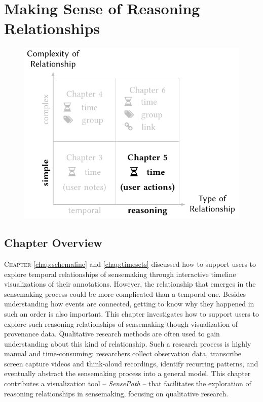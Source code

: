 \chapter{Making Sense of Reasoning Relationships}
\label{chap:sensepath}

\graphicspath{{Chapter5/figures/}}

\begin{figure}[!h]
	\centering
	\includegraphics{work}
\end{figure}

\pagebreak

\section{Chapter Overview}
\lettrine{C}{hapter} \ref{chap:schemaline} and \autoref{chap:timesets} discussed how to support users to explore temporal relationships of sensemaking through interactive timeline visualizations of their annotations. However, the relationship that emerges in the sensemaking process could be more complicated than a temporal one. Besides understanding how events are connected, getting to know why they happened in such an order is also important. This chapter investigates how to support users to explore such reasoning relationships of sensemaking though visualization of provenance data. Qualitative research methods are often used to gain understanding about this kind of relationship. Such a research process is highly manual and time-consuming: researchers collect observation data, transcribe screen capture videos and think-aloud recordings, identify recurring patterns, and eventually abstract the sensemaking process into a general model. This chapter contributes a visualization tool -- \emph{SensePath} -- that facilitates the exploration of reasoning relationships in sensemaking, focusing on qualitative research.

